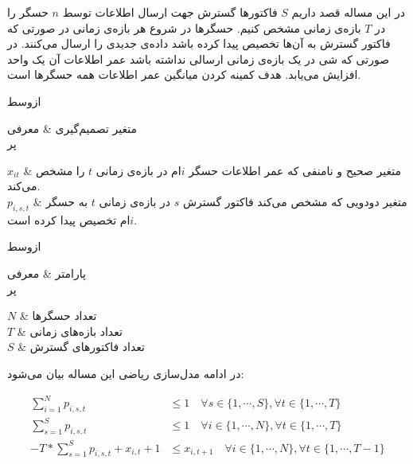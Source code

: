 

در این مساله قصد داریم $S$ فاکتورها گسترش جهت ارسال اطلاعات توسط $n$ حسگر را در $T$ بازه‌ی زمانی مشخص کنیم.
حسگرها در شروع هر بازه‌ی زمانی در صورتی که فاکتور گسترش به آن‌ها تخصیص پیدا کرده باشد داده‌ی جدیدی را ارسال می‌کنند.
در صورتی که شی در یک بازه‌ی زمانی ارسالی نداشته باشد عمر اطلاعات آن یک واحد افزایش می‌یابد.
هدف کمینه کردن میانگین عمر اطلاعات همه حسگر‌ها است.


‌ازوسط



متغیر تصمیم‌گیری & معرفی \\

‌پر

$x_{it}$ & متغیر صحیح و نامنفی که عمر اطلاعات حسگر $i$ام در بازه‌ی زمانی $t$ را مشخص می‌کند. \\

$p_{i,s,t}$ & متغیر دودویی که مشخص می‌کند فاکتور گسترش $s$ در بازه‌ی زمانی $t$ به حسگر $i$ام تخصیص پیدا کرده است. \\





‌ازوسط



پارامتر & معرفی \\

‌پر

$N$ & تعداد حسگرها \\

$T$ & تعداد بازه‌های زمانی \\

$S$ & تعداد فاکتورهای گسترش \\



در ادامه مدل‌سازی ریاضی این مساله بیان می‌شود:

\begin{align}
  \sum_{i = 1}^{N} p_{i, s, t} &\le 1 \quad \forall s \in \{1, \cdots, S\}, \forall t \in \{1, \cdots, T\} \label{eq:constr_subchannel_limit} \\
  \sum_{s = 1}^{S} p_{i, s, t} &\le 1 \quad \forall i \in \{1, \cdots, N\}, \forall t \in \{1, \cdots, T\} \label{eq:constr_thing_limit} \\
  -T * \sum_{s = 1}^{S} p_{i, s, t} + x_{i, t} + 1 &\le x_{i, t + 1} \quad \forall i \in \{1, \cdots, N\}, \forall t \in \{1, \cdots, T - 1\} \label{eq:constr_aoi_limit}
\end{align}

